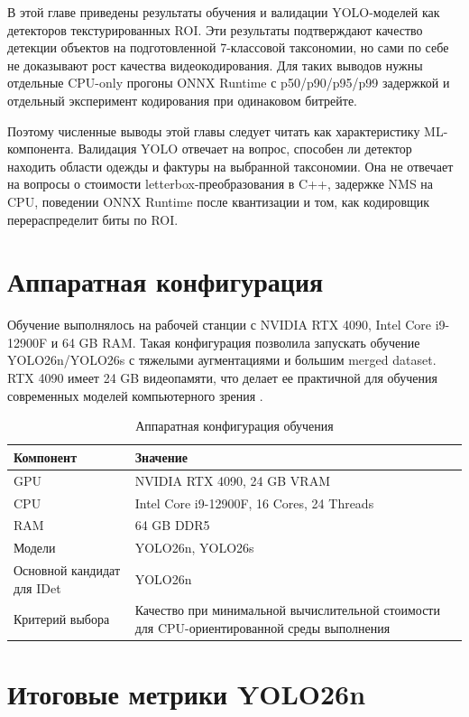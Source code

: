 \documentclass[12pt,a4paper,oneside,openany]{report}
\begin{document}
В этой главе приведены результаты обучения и валидации YOLO-моделей как детекторов текстурированных ROI. Эти результаты подтверждают качество детекции объектов на подготовленной 7-классовой таксономии, но сами по себе не доказывают рост качества видеокодирования. Для таких выводов нужны отдельные CPU-only прогоны ONNX Runtime с p50/p90/p95/p99 задержкой и отдельный эксперимент кодирования при одинаковом битрейте.

Поэтому численные выводы этой главы следует читать как характеристику ML-компонента. Валидация YOLO отвечает на вопрос, способен ли детектор находить области одежды и фактуры на выбранной таксономии. Она не отвечает на вопросы о стоимости letterbox-преобразования в C++, задержке NMS на CPU, поведении ONNX Runtime после квантизации и том, как кодировщик перераспределит биты по ROI.

\section{Аппаратная конфигурация}

Обучение выполнялось на рабочей станции с NVIDIA RTX 4090, Intel Core i9-12900F и 64 GB RAM. Такая конфигурация позволила запускать обучение YOLO26n/YOLO26s с тяжелыми аугментациями и большим merged dataset. RTX 4090 имеет 24 GB видеопамяти, что делает ее практичной для обучения современных моделей компьютерного зрения \cite{nvidia4090}.

\begin{table}[H]\centering\caption{Аппаратная конфигурация обучения}\label{tab:hardware}\begin{tabularx}{\linewidth}{lY}\toprule
Компонент & Значение \\
\midrule
GPU & NVIDIA RTX 4090, 24 GB VRAM \\
CPU & Intel Core i9-12900F, 16 Cores, 24 Threads \\
RAM & 64 GB DDR5\\
Модели & YOLO26n, YOLO26s \\
Основной кандидат для IDet & YOLO26n \\
Критерий выбора & Качество при минимальной вычислительной стоимости для CPU-ориентированной среды выполнения \\
\bottomrule\end{tabularx}
\end{table}

\section{Итоговые метрики YOLO26n}
\end{document}
